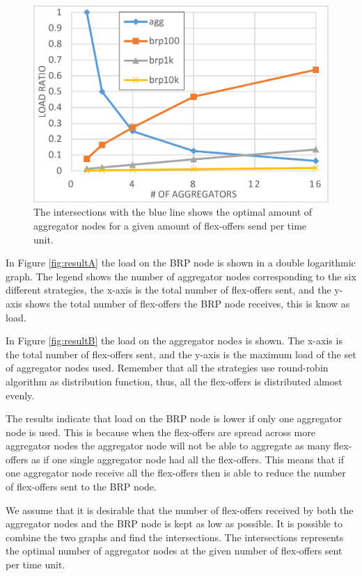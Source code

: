 \documentclass{ifacconf}
\begin{document}
\begin{figure}%
\centering
\includegraphics[width=0.75\columnwidth]{images/resultD.pdf}
\caption{The intersections with the blue line shows the optimal amount of aggregator nodes for a given amount of flex-offers send per time unit.}%
\label{fig:resultC}%
\end{figure}


In Figure \ref{fig:resultA} the load on the BRP node is shown in a double logarithmic graph. 
The legend shows the number of aggregator nodes corresponding to the six different strategies, 
the x-axis is the total number of flex-offers sent, 
and the y-axis shows the total number of flex-offers the BRP node receives, this is know as load.

In Figure \ref{fig:resultB} the load on the aggregator node\(s\) is shown. 
The x-axis is the total number of flex-offers sent, 
and the y-axis is the maximum load of the set of aggregator nodes used. 
Remember that all the strategies use round-robin algorithm as distribution function, thus, all the flex-offers is distributed almost evenly. 

The results indicate that load on the BRP node is lower if only one aggregator node is used. 
This is because when the flex-offers are spread across more aggregator nodes the aggregator node will not be able to aggregate as many flex-offers as if one single aggregator node had all the flex-offers. 
This means that if one aggregator node receive all the flex-offers then is able to reduce the number of flex-offers sent to the BRP node.

We assume that it is desirable that the number of flex-offers received by both the aggregator nodes and the BRP node is kept as low as possible.
It is possible to combine the two graphs and find the intersections.
The intersections represents the optimal number of aggregator nodes at the given number of flex-offers sent per time unit. 
\end{document}

